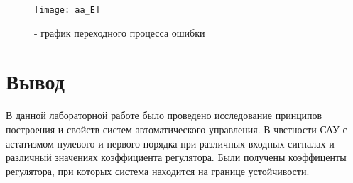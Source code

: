 \begin{figure}[H]
	\begin{center}
		\texttt{[image: aa\_E]}
		\caption{- график переходного процесса ошибки} 
		\label{pic:pic_21} %
	\end{center}
\end{figure}

\newpage

\section{Вывод}
В данной лабораторной работе было проведено исследование принципов построения и свойств систем автоматического управления. В чвстности САУ с астатизмом нулевого и первого порядка при различных входных сигналах и различный значениях коэффициента регулятора. Были получены коэффиценты регулятора, при которых система находится на границе устойчивости.

